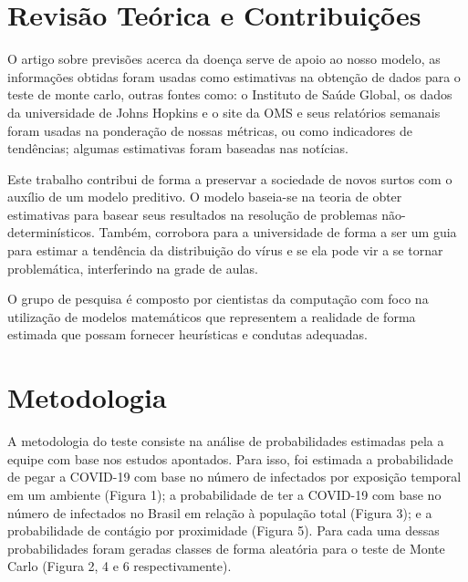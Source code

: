 \documentclass[onecolumn,12pt]{asme2ej}
\begin{document}
\section{Revisão Teórica e Contribuições}

O artigo sobre previsões acerca da doença\cite{forecasting} serve de apoio ao nosso modelo, as informações obtidas foram usadas como estimativas na obtenção de dados para o teste de monte carlo, outras fontes como: o Instituto de Saúde Global\cite{forecasting_2}, os dados da universidade de Johns Hopkins\cite{hopkins} e o site da OMS\cite{situation} e seus relatórios semanais foram usadas na ponderação de nossas métricas, ou como indicadores de tendências; algumas estimativas foram baseadas nas notícias\cite{healthline}\cite{rdsa}\cite{nsctotal}.

Este trabalho contribui de forma a preservar a sociedade de novos surtos com o auxílio de um modelo preditivo. O modelo baseia-se na teoria de obter estimativas para basear seus resultados na resolução de problemas não-determinísticos. Também, corrobora para a universidade de forma a ser um guia para estimar a tendência da distribuição do vírus e se ela pode vir a se tornar problemática, interferindo na grade de aulas. 

O grupo de pesquisa é composto por cientistas da computação com foco na utilização de modelos matemáticos que representem a realidade de forma estimada que possam fornecer heurísticas e condutas adequadas.

\section{Metodologia}

A metodologia do teste consiste na análise de probabilidades estimadas pela a equipe com base nos estudos apontados. Para isso, foi estimada a probabilidade de pegar a COVID-19 com base no número de infectados por exposição temporal em um ambiente\cite{nsctotal} (Figura 1); a probabilidade de ter a COVID-19 com base no número de infectados no Brasil em relação à população total\cite{situation} (Figura 3); e a probabilidade de contágio por proximidade (Figura 5). Para cada uma dessas probabilidades foram geradas classes de forma aleatória para o teste de Monte Carlo (Figura 2, 4 e 6 respectivamente). 
\end{document}
